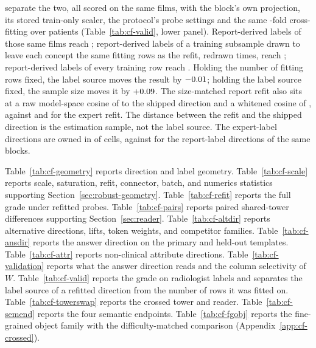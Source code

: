 separate the two, all scored on the same films, with the block's own projection, its stored train-only scaler, the protocol's probe settings and the same \cfVfArmFolds{}-fold cross-fitting over patients (Table~\ref{tab:cf-valid}, lower panel). Report-derived labels of those same \cfVfArmRows{} films reach \cfVfArmReportSameFilmsAuroc{}; report-derived labels of a training subsample drawn to leave each concept the same \cfVfArmReportSubRows{} fitting rows as the refit, redrawn \cfVfArmDraws{} times, reach \cfVfArmReportSubAuroc{}; report-derived labels of every training row reach \cfVfArmReportFullAuroc{}. Holding the number of fitting rows fixed, the label source moves the result by $-0.01$; holding the label source fixed, the sample size moves it by $+0.09$. The size-matched report refit also sits at a raw model-space cosine of \cfVfArmReportSubCos{} to the shipped direction and a whitened cosine of \cfVfArmReportSubCosWhite{}, against \cfVfArmExpertCos{} and \cfVfArmExpertCosWhite{} for the expert refit. The distance between the refit and the shipped direction is the estimation sample, not the label source. The expert-label directions are owned in \cfValidfitOwnedExpert{} of \cfValidfitCells{} cells, against \cfValidfitOwnedReport{} for the report-label directions of the same blocks.

Table~\ref{tab:cf-geometry} reports direction and label geometry. Table~\ref{tab:cf-scale} reports scale, saturation, refit, connector, batch, and numerics statistics supporting Section~\ref{sec:robust-geometry}. Table~\ref{tab:cf-refit} reports the full grade under refitted probes. Table~\ref{tab:cf-pairs} reports paired shared-tower differences supporting Section~\ref{sec:reader}. Table~\ref{tab:cf-altdir} reports alternative directions, lifts, token weights, and competitor families. Table~\ref{tab:cf-ansdir} reports the answer direction on the primary and held-out templates. Table~\ref{tab:cf-attr} reports non-clinical attribute directions. Table~\ref{tab:cf-validation} reports what the answer direction reads and the column selectivity of $W$. Table~\ref{tab:cf-valid} reports the grade on radiologist labels and separates the label source of a refitted direction from the number of rows it was fitted on. Table~\ref{tab:cf-towerswap} reports the crossed tower and reader. Table~\ref{tab:cf-semend} reports the four semantic endpoints. Table~\ref{tab:cf-fgobj} reports the fine-grained object family with the difficulty-matched comparison (Appendix~\ref{app:cf-crossed}).












